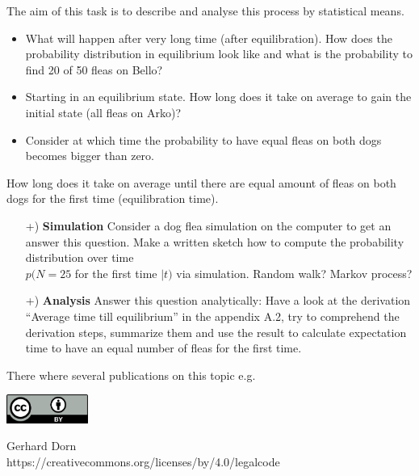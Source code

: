\documentclass[12pt,a4paper]{article} %
\begin{document}
 The aim of this task is to describe and analyse this process by statistical means.
 \begin{itemize}
 \item What will happen after very long time (after equilibration). How does the probability distribution in equilibrium look like and what is the probability to find 20 of 50 fleas on Bello?
 \item Starting in an equilibrium state. How long does it take on average to gain the initial state (all fleas on Arko)?
 \item Consider at which time the probability to have equal fleas on both dogs becomes bigger than zero.
 \end{itemize}
  How long does it take on average until there are equal amount of fleas on both dogs for the first time (equilibration time).
  \begin{itemize}
   \item[+)] \textbf{Simulation} Consider a dog flea simulation on the computer to get an answer this question. Make a written sketch how to compute the probability distribution over time \\
   $p(N=25$ for the first time $| t)$ via simulation. Random walk? Markov process? 
  \item[+)] \textbf{Analysis} Answer this question analytically: Have a look at the derivation ``Average time till equilibrium'' in the appendix A.2, try to comprehend the derivation steps, summarize them and use the result to calculate expectation time to have an equal number of fleas for the first time.
   \end{itemize}
  There where several publications on this topic e.g.~\cite{ambegaokar1999entropy}

\printbibliography
  


\vspace{2cm}
\begin{minipage}[t]{1\textwidth}
	\raggedleft
	\centering
\includegraphics[width = 0.20\textwidth]{CC-BY_icon}
\vspace{0.2cm}

\centering
{\Large Gerhard Dorn} \\
https://creativecommons.org/licenses/by/4.0/legalcode
\end{minipage}



  
\end{document}
